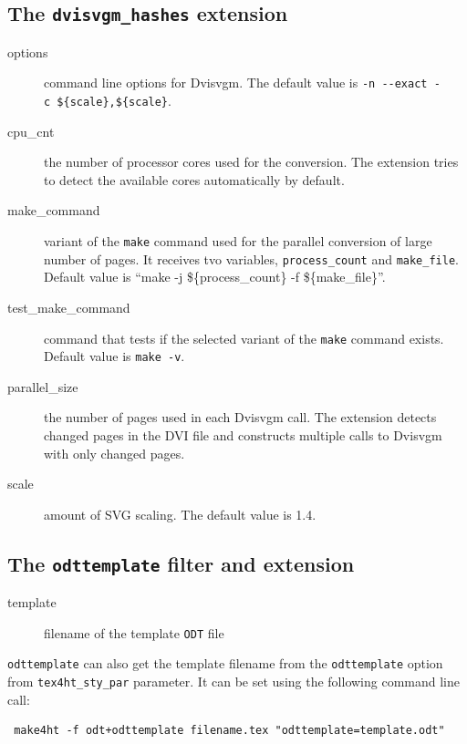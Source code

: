 \subsection{\texorpdfstring{The \texttt{dvisvgm\_hashes}
extension}{The dvisvgm\_hashes extension}}\label{the-dvisvgm_hashes-extension}

\begin{description}
\item[options]
command line options for Dvisvgm. The default value is
\texttt{-n\ -\/-exact\ -c\ \$\{scale\},\$\{scale\}}.
\item[cpu\_cnt]
the number of processor cores used for the conversion. The extension
tries to detect the available cores automatically by default.
\item[make\_command]
variant of the \texttt{make} command used for the parallel conversion of
large number of pages. It receives tvo variables,
\texttt{process\_count} and \texttt{make\_file}. Default value is ``make
-j \$\{process\_count\} -f \$\{make\_file\}''.
\item[test\_make\_command]
command that tests if the selected variant of the \texttt{make} command
exists. Default value is \texttt{make\ -v}.
\item[parallel\_size]
the number of pages used in each Dvisvgm call. The extension detects
changed pages in the DVI file and constructs multiple calls to Dvisvgm
with only changed pages.
\item[scale]
amount of SVG scaling. The default value is 1.4.
\end{description}

\subsection{\texorpdfstring{The \texttt{odttemplate} filter and
extension}{The odttemplate filter and extension}}\label{the-odttemplate-filter-and-extension}

\begin{description}
\item[template]
filename of the template \texttt{ODT} file
\end{description}

\texttt{odttemplate} can also get the template filename from the
\texttt{odttemplate} option from \texttt{tex4ht\_sty\_par} parameter. It
can be set using the following command line call:

\begin{verbatim}
 make4ht -f odt+odttemplate filename.tex "odttemplate=template.odt"
\end{verbatim}

